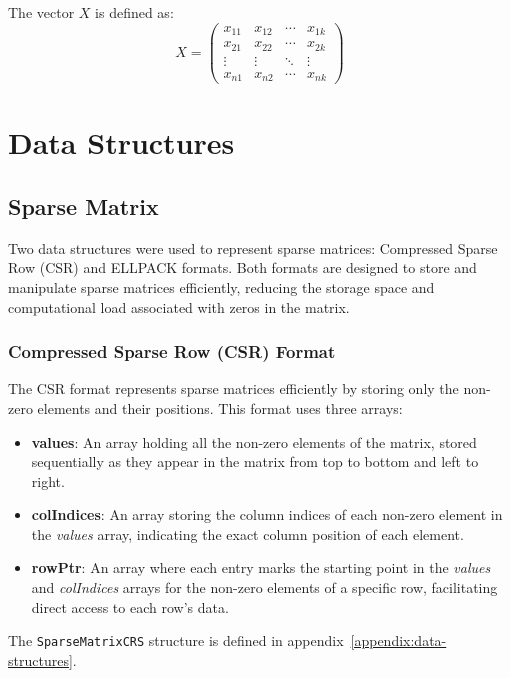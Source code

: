 \documentclass[12pt,oneside]{book} %
\begin{document}
The vector $X$ is defined as:
\begin{equation}
    X = \begin{pmatrix}
        x_{11} & x_{12} & \cdots & x_{1k} \\
        x_{21} & x_{22} & \cdots & x_{2k} \\
        \vdots & \vdots & \ddots & \vdots \\
        x_{n1} & x_{n2} & \cdots & x_{nk}
    \end{pmatrix}\label{eq:fat-vector}
\end{equation}

\section{Data Structures}

\subsection{Sparse Matrix}
Two data structures were used to represent sparse matrices: Compressed Sparse
Row (CSR) and ELLPACK formats. Both formats are designed to store and
manipulate sparse matrices efficiently, reducing the storage space and
computational load associated with zeros in the matrix.

\subsubsection{Compressed Sparse Row (CSR) Format}
The CSR format represents sparse matrices efficiently by storing only the
non-zero elements and their positions. This format uses three arrays:

\begin{itemize}
    \item \textbf{values}: An array holding all the non-zero elements of the matrix, stored sequentially as they appear in the matrix from top to bottom and left to right.
    \item \textbf{colIndices}: An array storing the column indices of each non-zero element in the \textit{values} array, indicating the exact column position of each element.
    \item \textbf{rowPtr}: An array where each entry marks the starting point in the \textit{values} and \textit{colIndices} arrays for the non-zero elements of a specific row, facilitating direct access to each row's data.
\end{itemize}

The \texttt{SparseMatrixCRS} structure is defined in
appendix~\ref{appendix:data-structures}.
\end{document}

